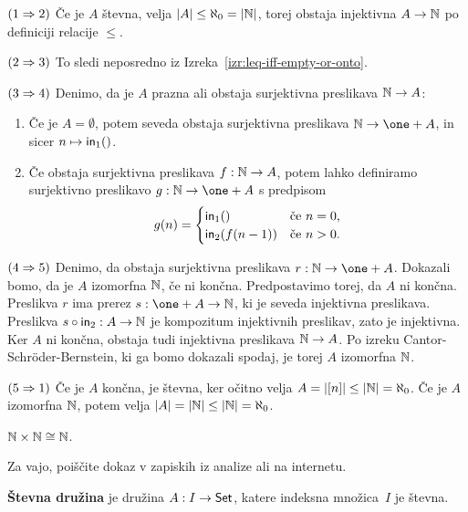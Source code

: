 \begin{dokaz}
$(1 \Rightarrow 2)$
%
Če je $A$ števna, velja $|A| \leq \aleph_0 = |\mathbb{N}|$, torej obstaja injektivna $A \to
\mathbb{N}$ po definiciji relacije $\leq$.

$(2 \Rightarrow 3)$
%
To sledi neposredno iz Izreka~\ref{izr:leq-iff-empty-or-onto}.

$(3 \Rightarrow 4)$
%
Denimo, da je $A$ prazna ali obstaja surjektivna preslikava $\mathbb{N} \to A$:
%
\begin{enumerate}
\item
  Če je $A = \emptyset$, potem seveda obstaja surjektivna preslikava $\NN \to \one + A$, in sicer
  $n \mapsto \mathsf{in}_1 ()$.
\item 
  Če obstaja surjektivna preslikava $f : \mathbb{N} \to A$, potem lahko definiramo surjektivno
  preslikavo $g : \NN \to \one + A$ s predpisom
  \begin{equation*}
    g(n) =
    \begin{cases}
      \mathsf{in}_1 ()      &\text{če $n = 0$,}\\
      \mathsf{in}_2 (f(n-1))   &\text{če $n > 0$.}
    \end{cases}
  \end{equation*}
\end{enumerate}

$(4 \Rightarrow 5)$
%
Denimo, da obstaja surjektivna preslikava $r : \NN \to \one + A$.
Dokazali bomo, da je $A$ izomorfna $\mathbb{N}$, če ni končna.
Predpostavimo torej, da $A$ ni končna.
Preslikva $r$ ima prerez $s : \one + A \to \NN$, ki je seveda injektivna preslikava.
Preslikva $s \circ \mathsf{in}_2 : A \to \mathbb{N}$ je kompozitum injektivnih preslikav, zato je injektivna.
Ker $A$ ni končna, obstaja tudi injektivna preslikava $\mathbb{N} \to A$.
Po izreku Cantor-Schröder-Bernstein, ki ga bomo dokazali spodaj, je torej $A$ izomorfna $\mathbb{N}$.

$(5 \Rightarrow 1)$
%
Če je $A$ končna, je števna, ker očitno velja $A = |[n]| \leq |\mathbb{N}| = \aleph_0$.
Če je $A$ izomorfna $\mathbb{N}$, potem velja $|A| = |\mathbb{N}| \leq |\mathbb{N}| = \aleph_0$.
\end{dokaz}

\begin{izrek}
  $\mathbb{N} \times \mathbb{N} \cong \mathbb{N}$.
\end{izrek}

\begin{dokaz}
  Za vajo, poiščite dokaz v zapiskih iz analize ali na internetu.
\end{dokaz}

\textbf{Števna družina} je družina $A : I \to \mathsf{Set}$, katere indeksna množica~$I$ je števna.

